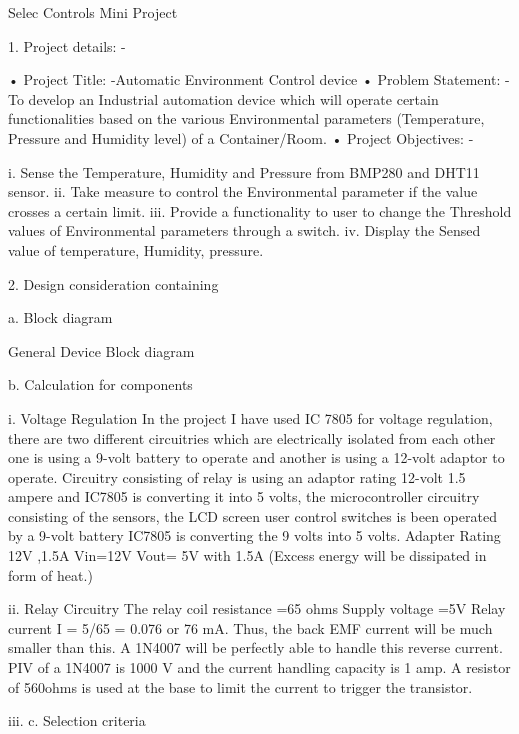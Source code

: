\label{index_md_C__Users_acer_STM32CubeIDE_workspace_1_10_2_Final_Selec_v3_Core_Readme}%
%
 Selec Controls Mini Project \begin{DoxyVerb}1.  Project details: -
\end{DoxyVerb}
 • Project Title\+: -\/Automatic Environment Control device • Problem Statement\+: -\/ To develop an Industrial automation device which will operate certain functionalities based on the various Environmental parameters (Temperature, Pressure and Humidity level) of a Container/\+Room. • Project Objectives\+: -\/

i. Sense the Temperature, Humidity and Pressure from BMP280 and DHT11 sensor. ii. Take measure to control the Environmental parameter if the value crosses a certain limit. iii. Provide a functionality to user to change the Threshold values of Environmental parameters through a switch. iv. Display the Sensed value of temperature, Humidity, pressure. ~\newline
 \begin{DoxyVerb}2. Design consideration containing

    a.   Block diagram 
\end{DoxyVerb}
 

General Device Block diagram

\begin{DoxyVerb}    b.  Calculation for components 

        i.  Voltage Regulation 
        In the project I have used IC 7805 for voltage regulation, there are two different circuitries which are electrically isolated from each other one is using a 9-volt battery to operate and another is using a 12-volt adaptor to operate. Circuitry consisting of relay is using an adaptor rating 12-volt 1.5 ampere and IC7805 is converting it into 5 volts, the microcontroller circuitry consisting of the sensors, the LCD screen user control switches is been operated by a 9-volt battery IC7805 is converting the 9 volts into 5 volts.
        Adapter Rating 12V ,1.5A
        Vin=12V
        Vout= 5V with 1.5A
        (Excess energy will be dissipated in form of heat.)  

        ii. Relay Circuitry 
        The relay coil resistance =65 ohms
        Supply voltage =5V
        Relay current I = 5/65 = 0.076 or 76 mA.
        Thus, the back EMF current will be much smaller than this. A 1N4007 will be perfectly able to handle this reverse current. PIV of a 1N4007 is 1000 V and the current handling capacity is 1 amp.
            A resistor of 560ohms is used at the base to limit the current to trigger the transistor.

        iii.    
    c.  Selection criteria 
\end{DoxyVerb}
 

